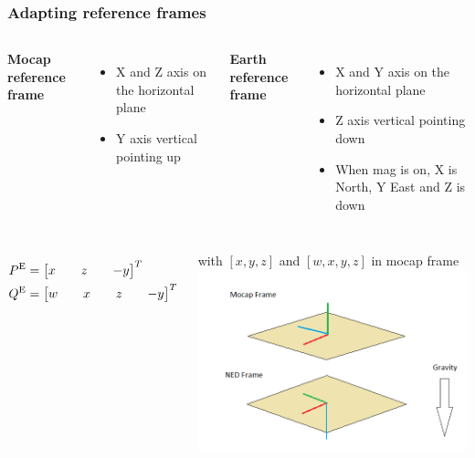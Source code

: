 \documentclass[xcolor=dvipsnames]{beamer}
\begin{document}
\begin{frame}[t]
\frametitle{Adapting reference frames}

\begin{columns}[t] %
\textbf{Mocap reference frame}
\begin{itemize}
\item X and Z axis on the horizontal plane
\item Y axis vertical pointing up

\end{itemize}
\textbf{Earth reference frame}
\begin{itemize}
\item X and Y axis on the horizontal plane
\item Z axis vertical pointing down
\item When mag is on, X is North, Y East and Z is down
\end{itemize}
\end{columns}

\begin{columns} %
\begin{equation*}
\begin{aligned}
P\textsuperscript{E}& = \begin{bmatrix}x&&z&&-y\end{bmatrix}^T
\\
Q\textsuperscript{E}& = \begin{bmatrix}
w&&x&&z&&-y
\end{bmatrix}^T\\
\end{aligned}
\end{equation*}

with $[x,y,z]$ and $[w,x,y,z]$ in mocap frame
\includegraphics[width = 1\textwidth]{f/frames.png}
\end{columns}
\end{frame}
\end{document}
